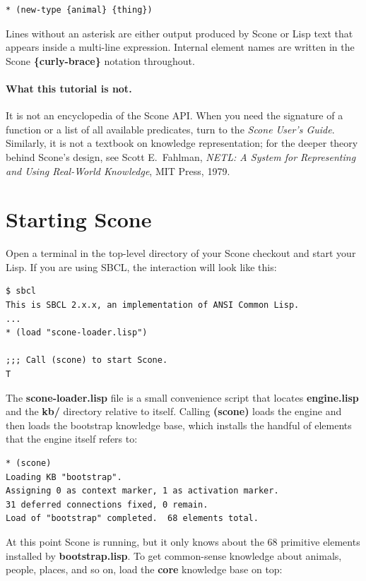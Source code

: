 \documentclass[titlepage,twoside,openright,11pt]{article}
\begin{document}
\begin{verbatim}
* (new-type {animal} {thing})
\end{verbatim}

Lines without an asterisk are either output produced by Scone or
Lisp text that appears inside a multi-line expression. Internal
element names are written in the Scone \textbf{\{curly-brace\}}
notation throughout.

\paragraph{What this tutorial is not.}
It is not an encyclopedia of the Scone API. When you need the
signature of a function or a list of all available predicates, turn
to the \emph{Scone User's Guide}. Similarly, it is not a textbook on
knowledge representation; for the deeper theory behind Scone's
design, see Scott E.\ Fahlman, \emph{NETL: A System for Representing
and Using Real-World Knowledge}, MIT Press, 1979.

\section{Starting Scone}\label{starting-scone}

Open a terminal in the top-level directory of your Scone checkout
and start your Lisp. If you are using SBCL, the interaction will
look like this:

\begin{verbatim}
$ sbcl
This is SBCL 2.x.x, an implementation of ANSI Common Lisp.
...
* (load "scone-loader.lisp")

;;; Call (scone) to start Scone.
T
\end{verbatim}

The \textbf{scone-loader.lisp} file is a small convenience script
that locates \textbf{engine.lisp} and the \textbf{kb/} directory
relative to itself. Calling \textbf{(scone)} loads the engine and
then loads the bootstrap knowledge base, which installs the handful
of elements that the engine itself refers to:

\begin{verbatim}
* (scone)
Loading KB "bootstrap".
Assigning 0 as context marker, 1 as activation marker.
31 deferred connections fixed, 0 remain.
Load of "bootstrap" completed.  68 elements total.
\end{verbatim}

At this point Scone is running, but it only knows about the 68
primitive elements installed by \textbf{bootstrap.lisp}. To get
common-sense knowledge about animals, people, places, and so on,
load the \textbf{core} knowledge base on top:
\end{document}
